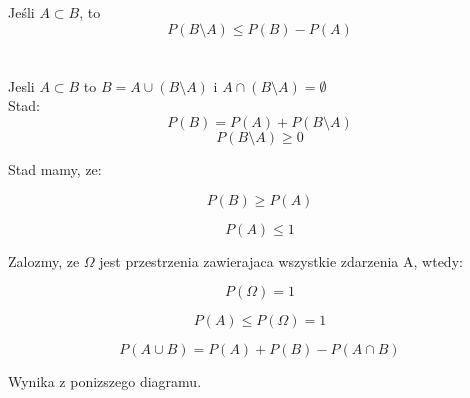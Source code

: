 Jeśli $A \subset B$, to 
$$
P(B \setminus A) \leq P(B) - P(A)
$$\\\\


Jesli $A \subset B$ to $ B = A \cup(B \setminus A) $ i $ A \cap (B \setminus A) = \emptyset $ \\
Stad:\\
$$ P(B) = P(A) + P(B \setminus A) $$ 
$$ P(B\setminus A) \geq 0 $$ 

Stad mamy, ze:

$$ P(B) \geq P(A) $$

\medskip
{} 
\medskip

$$
P(A) \leq 1
$$

Zalozmy, ze $\Omega$ jest przestrzenia zawierajaca wszystkie zdarzenia A, wtedy:

$$ P(\Omega) = 1 $$

$$ P(A) \leq P(\Omega) = 1 $$

\medskip
{} 
\medskip


$$
P(A \cup B) = P(A) + P(B) - P(A \cap B)
$$

Wynika z ponizszego diagramu. 


